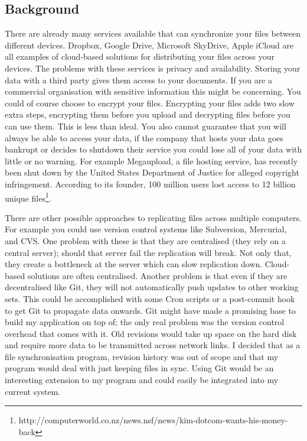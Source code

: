 \documentclass[12pt]{article}
\begin{document}
\subsection{Background}
There are already many services available
that can synchronize your files between different devices. 
Dropbox, Google Drive, Microsoft SkyDrive, Apple iCloud
are all examples of cloud-based solutions for distributing
your files across your devices. The problems with these
services is privacy and availability. Storing your data with a
third party gives them access to your documents. If you
are a commercial organisation with sensitive information
this might be concerning. You could
of course choose to encrypt your files. Encrypting your files adds
two slow extra steps, encrypting them before you upload and decrypting
files before you can use them. This is less than ideal. 
You also cannot guarantee
that you will always be able to access your data, if
the company that hosts your data goes bankrupt or
decides to shutdown their service
you could lose all
of your data with little or no warning. 
For example Megaupload, a file hosting service,
has recently been shut down by the United States Department of
Justice for alleged copyright infringement. According to
its founder, 100 million users lost access to 12 billion
unique files\footnote{http://computerworld.co.nz/news.nsf/news/kim-dotcom-wants-his-money-back}.

There are other possible approaches to replicating files
across multiple computers. For example you could use
version control systems like Subversion, Mercurial, and
CVS. One problem with these is that they are
centralised (they rely on a central server); should that
server fail the replication will break. Not only
that, they create a bottleneck at the server which can slow
replication down.
Cloud-based solutions are often centralised. 
Another problem is that even if they are decentralised
like Git, they will not automatically push updates to other
working sets. This could be accomplished with some
Cron scripts or a post-commit hook to get Git to
propagate data onwards. Git might have made a promising
base to build my application on top of; the only real
problem was the version control overhead that comes with
it. Old revisions would take up space on the hard disk
and require more data to be transmitted across network links.
I decided that as a file synchronisation program, revision
history was out of scope and that my program would
deal with just keeping files in sync. Using Git would be
an interesting extension to my program and could easily
be integrated into my current system.
\end{document}
